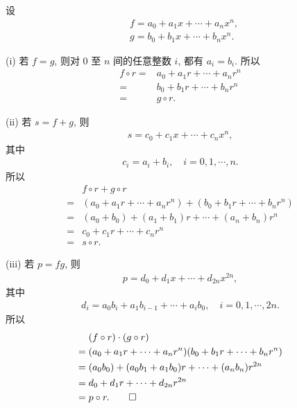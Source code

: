 \begin{pf}
    设
    \begin{align*}
         & f = a_0 + a_1 x + \cdots + a_n x^n, \\
         & g = b_0 + b_1 x + \cdots + b_n x^n.
    \end{align*}

    (i) 若 $f = g$, 则对 $0$ 至 $n$ 间的任意整数 $i$, 都有 $a_i = b_i$. 所以
    \begin{align*}
        f \circ r
        = {} & a_0 + a_1 r + \cdots + a_n r^n \\
        = {} & b_0 + b_1 r + \cdots + b_n r^n \\
        = {} & g \circ r.
    \end{align*}

    (ii) 若 $s = f + g$, 则
    \begin{align*}
        s = c_0 + c_1 x + \cdots + c_n x^n,
    \end{align*}
    其中
    \begin{align*}
        c_i = a_i + b_i, \quad i = 0,1,\cdots,n.
    \end{align*}
    所以
    \begin{align*}
             & f \circ r + g \circ r                                               \\
        = {} & (a_0 + a_1 r + \cdots + a_n r^n) + (b_0 + b_1 r + \cdots + b_n r^n) \\
        = {} & (a_0 + b_0) + (a_1 + b_1) r + \cdots + (a_n + b_n) r^n              \\
        = {} & c_0 + c_1 r + \cdots + c_n r^n                                      \\
        = {} & s \circ r.
    \end{align*}

    (iii) 若 $p = fg$, 则
    \begin{align*}
        p = d_0 + d_1 x + \cdots + d_{2n} x^{2n},
    \end{align*}
    其中
    \begin{align*}
        d_i = a_0 b_i + a_1 b_{i-1} + \cdots + a_i b_0, \quad i = 0,1,\cdots,2n.
    \end{align*}
    所以
    \begin{align*}
             & (f \circ r) \cdot (g \circ r)                                     \\
        = {} & (a_0 + a_1 r + \cdots + a_n r^n) (b_0 + b_1 r + \cdots + b_n r^n) \\
        = {} & (a_0 b_0) + (a_0 b_1 + a_1 b_0) r + \cdots + (a_n b_n) r^{2n}     \\
        = {} & d_0 + d_1 r + \cdots + d_{2n} r^{2n}                              \\
        = {} & p \circ r. \qedhere
    \end{align*}
\end{pf}

